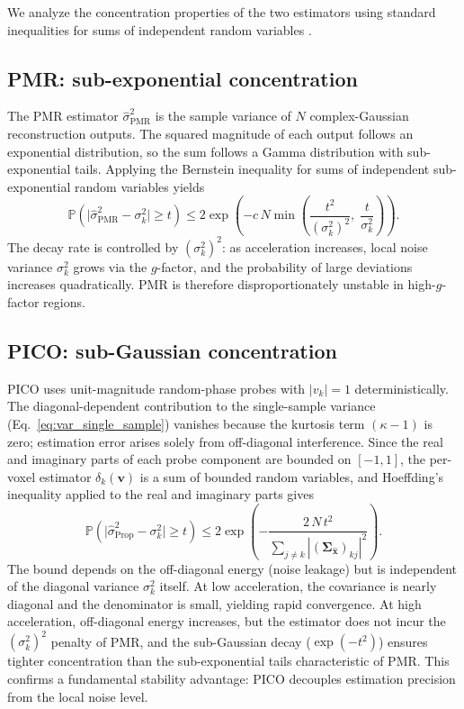 \documentclass[AMA,STIX2COL,Linenumberson]{MRM}
\begin{document}
We analyze the concentration properties of the two estimators 
using standard inequalities for sums of independent random 
variables \cite{Vershynin_2026}.
 
\subsection{PMR: sub-exponential concentration}
The PMR estimator $\hat{\sigma}^2_{\mathrm{PMR}}$ is the 
sample variance of $N$ complex-Gaussian reconstruction 
outputs. The squared magnitude of each output follows an 
exponential distribution, so the sum follows a Gamma 
distribution with sub-exponential tails. Applying the Bernstein inequality for sums of independent sub-exponential random variables \cite[Theorem~2.8.1]{Vershynin_2026} yields
\begin{equation}
\mathbb{P}\!\left( 
  \bigl| \hat{\sigma}^2_{\mathrm{PMR}} - \sigma_k^2 \bigr| 
  \ge t \right) 
\le 2 \exp\!\left( -c\,N \min\!\left( 
  \frac{t^2}{(\sigma_k^2)^2},\; 
  \frac{t}{\sigma_k^2} \right) \right).
\end{equation}
The decay rate is controlled by $(\sigma_k^2)^2$: as 
acceleration increases, local noise variance $\sigma_k^2$ 
grows via the $g$-factor, and the probability of large 
deviations increases quadratically. PMR is therefore 
disproportionately unstable in high-$g$-factor regions.
 
\subsection{PICO: sub-Gaussian concentration}
PICO uses unit-magnitude random-phase probes with
$|v_k| = 1$ deterministically. The diagonal-dependent contribution to the single-sample variance (Eq.~\eqref{eq:var_single_sample}) vanishes because the kurtosis term $(\kappa - 1)$ is zero; estimation error
arises solely from off-diagonal interference. Since the real and imaginary parts of each probe component are bounded on $[-1,1]$, the per-voxel estimator $\delta_k(\mathbf{v})$ is a sum of bounded random variables, and Hoeffding's inequality \cite[Theorem~2.2.5]{Vershynin_2026} applied to the real and imaginary parts gives
\begin{equation}
\mathbb{P}\!\left( 
  \bigl| \hat{\sigma}^2_{\mathrm{Prop}} - \sigma_k^2 \bigr| 
  \ge t \right) 
\le 2 \exp\!\left( 
  -\frac{2\,N\,t^2}
  {\sum_{j \neq k} 
   |(\boldsymbol{\Sigma}_{\hat{\mathbf{x}}})_{kj}|^2} 
\right).
\end{equation}
The bound depends on the off-diagonal energy (noise leakage) 
but is independent of the diagonal variance $\sigma_k^2$ 
itself. At low acceleration, the covariance is nearly 
diagonal and the denominator is small, yielding rapid 
convergence. At high acceleration, off-diagonal energy 
increases, but the estimator does not incur the 
$(\sigma_k^2)^2$ penalty of PMR, and the sub-Gaussian decay 
($\exp(-t^2)$) ensures tighter concentration than the 
sub-exponential tails characteristic of PMR. This confirms a 
fundamental stability advantage: PICO 
decouples estimation precision from the local noise level.
 
\end{document}
